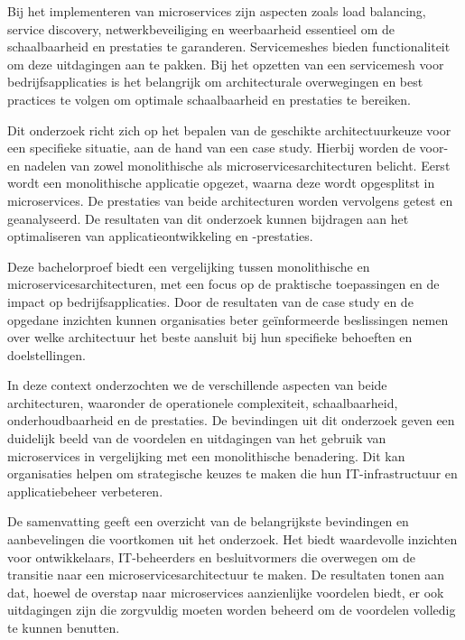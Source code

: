 Bij het implementeren van microservices zijn aspecten zoals load balancing, service discovery, netwerkbeveiliging en weerbaarheid essentieel om de schaalbaarheid en prestaties te garanderen. Servicemeshes bieden functionaliteit om deze uitdagingen aan te pakken. Bij het opzetten van een servicemesh voor bedrijfsapplicaties is het belangrijk om architecturale overwegingen en best practices te volgen om optimale schaalbaarheid en prestaties te bereiken.


Dit onderzoek richt zich op het bepalen van de geschikte architectuurkeuze voor een specifieke situatie, aan de hand van een case study. Hierbij worden de voor- en nadelen van zowel monolithische als microservicesarchitecturen belicht. Eerst wordt een monolithische applicatie opgezet, waarna deze wordt opgesplitst in microservices. De prestaties van beide architecturen worden vervolgens getest en geanalyseerd. De resultaten van dit onderzoek kunnen bijdragen aan het optimaliseren van applicatieontwikkeling en -prestaties.


Deze bachelorproef biedt een vergelijking tussen monolithische en microservicesarchitecturen, met een focus op de praktische toepassingen en de impact op bedrijfsapplicaties. Door de resultaten van de case study en de opgedane inzichten kunnen organisaties beter geïnformeerde beslissingen nemen over welke architectuur het beste aansluit bij hun specifieke behoeften en doelstellingen. 


In deze context onderzochten we de verschillende aspecten van beide architecturen, waaronder de operationele complexiteit, schaalbaarheid, onderhoudbaarheid en de prestaties. De bevindingen uit dit onderzoek geven een duidelijk beeld van de voordelen en uitdagingen van het gebruik van microservices in vergelijking met een monolithische benadering. Dit kan organisaties helpen om strategische keuzes te maken die hun IT-infrastructuur en applicatiebeheer verbeteren.


De samenvatting geeft een overzicht van de belangrijkste bevindingen en aanbevelingen die voortkomen uit het onderzoek. Het biedt waardevolle inzichten voor ontwikkelaars, IT-beheerders en besluitvormers die overwegen om de transitie naar een microservicesarchitectuur te maken. De resultaten tonen aan dat, hoewel de overstap naar microservices aanzienlijke voordelen biedt, er ook uitdagingen zijn die zorgvuldig moeten worden beheerd om de voordelen volledig te kunnen benutten.

